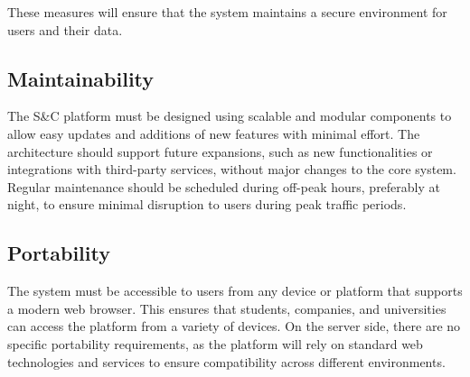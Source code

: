 These measures will ensure that the system maintains a secure
environment for users and their data.


\subsection{Maintainability}
\label{subsec:maintainability}%


The S\&C platform must be designed using scalable and modular components
to allow easy updates and additions of new features with minimal effort.
The architecture should support future expansions, such as new
functionalities or integrations with third-party services, without major
changes to the core system. Regular maintenance should be scheduled
during off-peak hours, preferably at night, to ensure minimal disruption
to users during peak traffic periods.


\subsection{Portability}
\label{subsec:portability}%


The system must be accessible to users from any device or platform that
supports a modern web browser. This ensures that students, companies,
and universities can access the platform from a variety of devices. On
the server side, there are no specific portability requirements, as the
platform will rely on standard web technologies and services to ensure
compatibility across different environments.